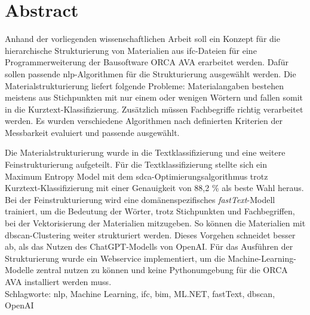 \chapter*{Abstract}
Anhand der vorliegenden wissenschaftlichen Arbeit soll ein Konzept für die hierarchische Strukturierung von Materialien aus \acf{ifc}-Dateien für eine Programmerweiterung der Bausoftware ORCA AVA erarbeitet werden. Dafür sollen passende \acf{nlp}-Algorithmen für die Strukturierung ausgewählt werden. Die Materialstrukturierung liefert folgende Probleme: Materialangaben bestehen meistens aus Stichpunkten mit nur einem oder wenigen Wörtern und fallen somit in die Kurztext-Klassifizierung. Zusätzlich müssen Fachbegriffe richtig verarbeitet werden. Es wurden verschiedene Algorithmen nach definierten Kriterien der Messbarkeit evaluiert und passende ausgewählt.

Die Materialstrukturierung wurde in die Textklassifizierung und eine weitere Feinstrukturierung aufgeteilt. Für die Textklassifizierung stellte sich ein Maximum Entropy Model mit dem \ac{sdca}-Optimierungsalgorithmus trotz Kurztext-Klassifizierung mit einer Genauigkeit von 88,2 \% als beste Wahl heraus. Bei der Feinstrukturierung wird eine domänenspezifisches \textit{fastText}-Modell trainiert, um die Bedeutung der Wörter, trotz Stichpunkten und Fachbegriffen, bei der Vektorisierung der Materialien mitzugeben. So können die Materialien mit \acf{dbscan}-Clustering weiter strukturiert werden. Dieses Vorgehen schneidet besser ab, als das Nutzen des ChatGPT-Modells von OpenAI. Für das Ausführen der Strukturierung wurde ein Webservice implementiert, um die Machine-Learning-Modelle zentral nutzen zu können und keine Pythonumgebung für die ORCA AVA installiert werden muss.\\

\noindent Schlagworte: \acs{nlp}, Machine Learning, \acs{ifc}, \acs{bim}, ML.NET, fastText, \acs{dbscan}, OpenAI

